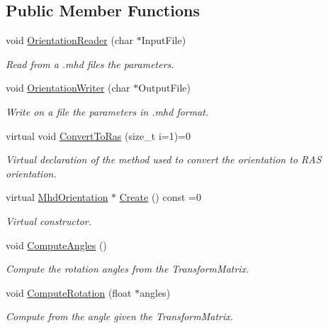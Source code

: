 \subsection*{\-Public \-Member \-Functions}
\begin{DoxyCompactItemize}
\item 
void \hyperlink{classMhd_1_1MhdOrientation_a3e5bf4259db2501f55dddb11cdf6aee5}{\-Orientation\-Reader} (char $\ast$\-Input\-File)
\begin{DoxyCompactList}\small\item\em \-Read from a .mhd files the parameters. \end{DoxyCompactList}\item 
void \hyperlink{classMhd_1_1MhdOrientation_afacfca17977387eb2be74f0f28dc681e}{\-Orientation\-Writer} (char $\ast$\-Output\-File)
\begin{DoxyCompactList}\small\item\em \-Write on a file the parameters in .mhd format. \end{DoxyCompactList}\item 
virtual void \hyperlink{classMhd_1_1MhdOrientation_ad42f327fc9e94d827dba171773cea25f}{\-Convert\-To\-Ras} (size\-\_\-t i=1)=0
\begin{DoxyCompactList}\small\item\em \-Virtual declaration of the method used to convert the orientation to \-R\-A\-S orientation. \end{DoxyCompactList}\item 
virtual \hyperlink{classMhd_1_1MhdOrientation}{\-Mhd\-Orientation} $\ast$ \hyperlink{classMhd_1_1MhdOrientation_a5554337cc931090c765f41ce46c335fe}{\-Create} () const =0
\begin{DoxyCompactList}\small\item\em \-Virtual constructor. \end{DoxyCompactList}\item 
void \hyperlink{classMhd_1_1MhdOrientation_ad26f040a61bc26601fa29fcfd8910203}{\-Compute\-Angles} ()
\begin{DoxyCompactList}\small\item\em \-Compute the rotation angles from the \-Transform\-Matrix. \end{DoxyCompactList}\item 
void \hyperlink{classMhd_1_1MhdOrientation_a1163ffc15df563d621125166a442441f}{\-Compute\-Rotation} (float $\ast$angles)
\begin{DoxyCompactList}\small\item\em \-Compute from the angle given the \-Transform\-Matrix. \end{DoxyCompactList}\item 

\end{DoxyCompactItemize}
